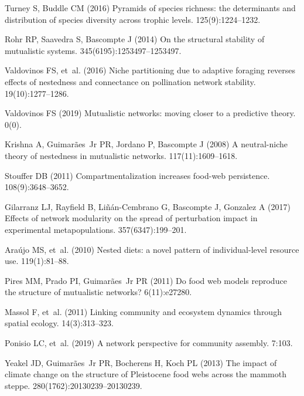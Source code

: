 \documentclass[9pt,twocolumn,twoside]{pnas-new}
\begin{document}
\begin{thebibliography}{10}
Turney S, Buddle CM (2016) Pyramids of species richness: the determinants and
  distribution of species diversity across trophic levels.
 125(9):1224--1232.

Rohr RP, Saavedra S, Bascompte J (2014) {On the structural stability of
  mutualistic systems}.
 345(6195):1253497--1253497.

Valdovinos FS, et~al. (2016) {Niche partitioning due to adaptive foraging
  reverses effects of nestedness and connectance on pollination network
  stability}.
 19(10):1277--1286.

Valdovinos FS (2019) Mutualistic networks: moving closer to a predictive
  theory.
 0(0).

Krishna A, Guimar{\~a}es~Jr PR, Jordano P, Bascompte J (2008) {A neutral-niche
  theory of nestedness in mutualistic networks}.
 117(11):1609--1618.

Stouffer DB (2011) {Compartmentalization increases food-web persistence}.
 108(9):3648--3652.

Gilarranz LJ, Rayfield B, Li{\~n}{\'a}n-Cembrano G, Bascompte J, Gonzalez A
  (2017) {Effects of network modularity on the spread of perturbation impact in
  experimental metapopulations}.
 357(6347):199--201.

Ara\'{u}jo MS, et~al. (2010) Nested diets: a novel pattern of individual-level
  resource use.
 119(1):81--88.

Pires MM, Prado PI, Guimar{\~a}es~Jr PR (2011) Do food web models reproduce the
  structure of mutualistic networks?
 6(11):e27280.

Massol F, et~al. (2011) {Linking community and ecosystem dynamics through
  spatial ecology}.
 14(3):313--323.

Ponisio LC, et~al. (2019) A network perspective for community assembly.
 7:103.

Yeakel JD, Guimar{\~a}es~Jr PR, Bocherens H, Koch PL (2013) {The impact of
  climate change on the structure of Pleistocene food webs across the mammoth
  steppe}.
 280(1762):20130239--20130239.


\end{thebibliography}
\end{document}
